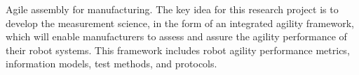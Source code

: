 Agile assembly for manufacturing. The key idea for this research project is to develop the measurement science, in the form of an integrated agility framework, which will enable manufacturers to assess and assure the agility performance of their robot systems. This framework includes robot agility performance metrics, information models, test methods, and protocols.
